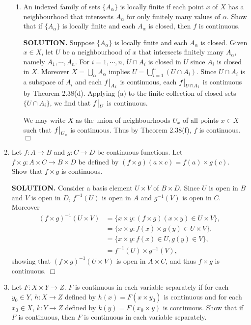 \documentclass{article}
\begin{document}
\begin{enumerate}
\begin{enumerate}
    \item An indexed family of sets $\{A_\alpha\}$ is locally finite if each point $x$ of $X$ has a neighbourhood that intersects $A_\alpha$ for only finitely many values of $\alpha$. Show that if $\{A_\alpha\}$ is locally finite and each $A_\alpha$ is closed, then $f$ is continuous.

    {\bf SOLUTION.} Suppose $\{A_\alpha\}$ is locally finite and each $A_\alpha$ is closed. Given $x \in X$, let $U$ be a neighbourhood of $x$ that intersects finitely many $A_\alpha$, namely $A_1, \cdots, A_n$. For $i = 1, \cdots, n$, $U \cap A_i$ is closed in $U$ since $A_i$ is closed in $X$. Moreover $X = \bigcup_\alpha A_\alpha$ implies $U = \bigcup_{i=1}^n (U \cap A_i)$. Since $U \cap A_i$ is a subspace of $A_i$ and each $\restr{f}{A_i}$ is continuous, each $\restr{f}{U \cap A_i}$ is continuous by Theorem 2.38(d). Applying (a) to the finite collection of closed sets $\{U \cap A_i\}$, we find that $\restr{f}{U}$ is continuous. 
    
    We may write $X$ as the union of neighbourhoods $U_x$ of all points $x \in X$ such that $\restr{f}{U_x}$ is continuous. Thus by Theorem 2.38(f), $f$ is continuous. $\Box$
    \end{enumerate}

    \item Let $f: A \rightarrow B$ and $g: C \rightarrow D$ be continuous functions. Let $f \times g: A \times C \rightarrow B \times D$ be defined by $(f \times g)(a \times c) = f(a) \times g(c)$. Show that $f \times g$ is continuous.

    {\bf SOLUTION.} Consider a basis element $U \times V$ of $B \times D$. Since $U$ is open in $B$ and $V$ is open in $D$, $f^{-1}(U)$ is open in $A$ and $g^{-1}(V)$ is open in $C$. Moreover
    \begin{align*}
        (f \times g)^{-1}(U \times V) &= \{x \times y: (f \times g)(x\times y) \in U \times V\}, \\
        &= \{x \times y: f(x) \times g(y) \in U \times V\}, \\
        &= \{x \times y: f(x) \in U, g(y) \in V\}, \\
        &= f^{-1}(U) \times g^{-1}(V),
    \end{align*}
    showing that $(f \times g)^{-1}(U \times V)$ is open in $A \times C$, and thus $f \times g$ is continuous. $\Box$

    \item Let $F: X \times Y \rightarrow Z$. $F$ is continuous in each variable separately if for each $y_0 \in Y$, $h: X \rightarrow Z$ defined by $h(x) = F(x \times y_0)$ is continuous and for each $x_0 \in X$, $k: Y \rightarrow Z$ defined by $k(y) = F(x_0 \times y)$ is continuous. Show that if $F$ is continuous, then $F$ is continuous in each variable separately.


\end{enumerate}
\end{document}

